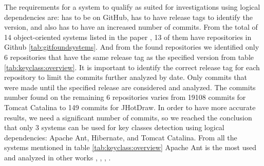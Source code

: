 \documentclass[12pt]{mitthesis}
\begin{document}
The requirements for a system to qualify as suited for investigations using logical dependencies are: has to be on GitHub, has to have release tags to identify the version, and also has to have an increased number of commits. 
From the total of 14 object-oriented systems listed in the paper \cite{Finding-key-classes}, 13 of them have repositories in Github \ref{tab:gitfoundsystems}. And from the found repositories we identified only 6 repositories that have the same release tag as the specified version from table \ref{tab:keyclass:overview}. It is important to identify the correct release tag for each repository to limit the commits further analyzed by date. Only commits that were made until the specified release are considered and analyzed.
The commits number found on the remaining 6 repositories varies from 19108 commits for Tomcat Catalina to 149 commits for JHotDraw. In order to have more accurate results, we need a significant number of commits, so we reached the conclusion that only 3 systems can be used for key classes detection using logical dependencies: Apache Ant, Hibernate, and Tomcat Catalina.  From all the systems mentioned in table \ref{tab:keyclass:overview} Apache Ant is the most used and analyzed in other  works \cite{enase19}, \cite{7332515}, \cite{1402122}, \cite{Kamran2016IdentificationOC}.
\end{document}
